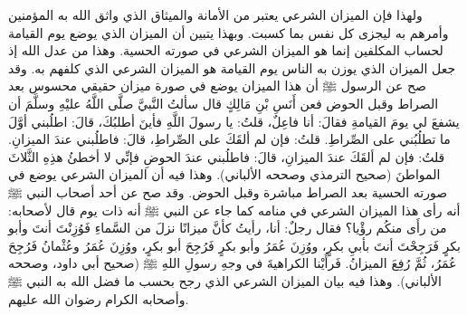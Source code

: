 ولهذا فإن الميزان الشرعي يعتبر من الأمانة والميثاق الذي واثق الله به المؤمنين وأمرهم به ليجزى كل نفس بما كسبت. وبهذا يتبين أن الميزان الذي يوضع يوم القيامة لحساب المكلفين إنما هو الميزان الشرعي في صورته الحسية. وهذا من عدل الله إذ جعل الميزان الذي يوزن به الناس يوم القيامة هو الميزان الشرعي الذي كلفهم به. وقد صح عن الرسول ﷺ أن هذا الميزان يوضع في صورة ميزان حقيقي محسوس بعد الصراط وقبل الحوض فعن أَنَسِ بْنِ مَالِكٍ قال سألتُ النَّبيَّ صلَّى اللَّهُ عليْهِ وسلَّمَ أن يشفعَ لي يومَ القيامةِ فقالَ: أنا فاعِلٌ، قلتُ: يا رسولَ اللَّهِ فأينَ أطلبُكَ، قالَ: اطلُبني أوَّلَ ما تطلُبُني على الصِّراطِ. قلتُ: فإن لم ألقَكَ على الصِّراطِ، قالَ: فاطلُبني عندَ الميزانِ. قلتُ: فإن لم ألقَكَ عندَ الميزانِ، قالَ: فاطلُبني عندَ الحوضِ فإنِّي لا أخطئُ هذِهِ الثَّلاثَ المواطنَ {\footnotesize (صحيح الترمذي وصححه الألباني)}. وهذا فيه أن الميزان الشرعي يوضع في صورته الحسية بعد الصراط مباشرة وقبل الحوض. وقد صح عن أحد أصحاب النبي ﷺ أنه رأى هذا الميزان الشرعي في منامه كما جاء عن النبي ﷺ أنه ذات يوم قال لأصحابه: من رأَى منكُم رؤْيا؟ فقال رجلٌ: أنا، رأيتُ كأنَّ ميزانًا نزلَ من السَّماءِ فَوُزِنْتَ أنتَ وأبو بكرٍ فَرَجِحْتَ أنتَ بأبيِ بكرٍ، ووُزِنَ عُمَرُ وأبو بكرٍ فَرُجِحَ أبو بكرٍ، ووُزِنَ عُمَرُ وعُثْمانُ فَرُجِحَ عُمَرُ، ثُمَّ رُفِعَ الميزانُ. فَرأَيْنا الكراهيةَ في وجهِ رسولِ اللهِ ﷺ {\footnotesize (صحيح أبي داود، وصححه الألباني)}. وهذا فيه بيان الميزان الشرعي الذي رجح بحسب ما فضل الله به النبي ﷺ وأصحابه الكرام رضوان الله عليهم. 

